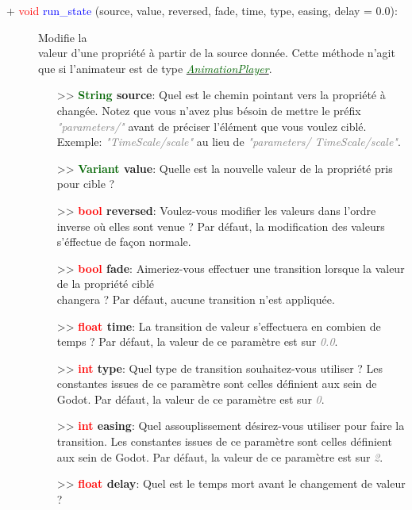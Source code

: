 \documentclass[a4paper, 11pt]{article}
\begin{document}
	\newpage \begin{description}
		\item [+ \textcolor{red}{void} \textcolor{blue}{run\_state} (source, value, reversed, fade, time, 
		type, easing, delay = 0.0):] Modifie la \\valeur d'une propriété à partir de la source donnée. Cette 
		méthode n'agit que si l'animateur est de type
		\href{https://docs.godotengine.org/en/stable/classes/class_animationplayer.html}
		{\textit{\textcolor{darkgreen}{AnimationPlayer}}}.
		\begin{itemize}
			\item [>> \textbf{\textcolor{darkgreen}{String} source}:] Quel est le chemin pointant vers la
			propriété à changée. Notez que vous n'avez plus bésoin de mettre le préfix \textcolor{gray}
			{\textit{"parameters/"}} avant de préciser l'élément que vous voulez ciblé. Exemple: 
			\textcolor{gray}{\textit{"TimeScale/scale"}} au lieu de \textcolor{gray}{\textit{"parameters/
			TimeScale/scale"}}.
			\item [>> \textbf{\textcolor{darkgreen}{Variant} value}:] Quelle est la nouvelle valeur de la
			propriété pris pour cible ?
			\item [>> \textbf{\textcolor{red}{bool} reversed}:] Voulez-vous modifier les valeurs dans 
			l'ordre inverse où elles sont venue ? Par défaut, la modification des valeurs s'éffectue de 
			façon normale.
			\item [>> \textbf{\textcolor{red}{bool} fade}:] Aimeriez-vous effectuer une transition lorsque 
			la valeur de la propriété ciblé \\changera ? Par défaut, aucune transition n'est appliquée.
			\item [>> \textbf{\textcolor{red}{float} time}:] La transition de valeur s'effectuera en combien 
			de temps ? Par défaut, la valeur de ce paramètre est sur \textcolor{gray}{\textit{0.0}}.
			\item [>> \textbf{\textcolor{red}{int} type}:] Quel type de transition souhaitez-vous utiliser ? 
			Les constantes issues de ce paramètre sont celles définient aux sein de Godot. Par défaut, la 
			valeur de ce paramètre est sur \textcolor{gray}{\textit{0}}.
			\item [>> \textbf{\textcolor{red}{int} easing}:] Quel assouplissement désirez-vous utiliser pour 
			faire la transition. Les constantes issues de ce paramètre sont celles définient aux sein de 
			Godot. Par défaut, la valeur de ce paramètre est sur \textcolor{gray}{\textit{2}}.
			\item [>> \textbf{\textcolor{red}{float} delay}:] Quel est le temps mort avant le changement de 
			valeur ?\\
		\end{itemize}
	\end{description}
\end{document}
